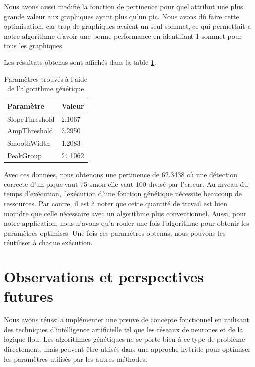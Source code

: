 \documentclass[12pt,letterpaper]{article}
\begin{document}
Nous avons aussi modifié la fonction de pertinence pour quel attribut une plus grande valeur aux graphiques ayant plus qu’un pic.
Nous avons dû faire cette optimisation, car trop de graphiques avaient un seul sommet, ce qui permettait a notre algorithme d'avoir une bonne
performance en identifiant 1 sommet pour tous les graphiques.

Les résultats obtenus sont affichés dans la table \ref{tab:genparam}.

\begin{table}[h]
  \begin{center}
    \begin{tabular} {|l|l|}
        \hline
        \bf{Paramètre} & \bf{Valeur} \\
        \hline
        SlopeThreshold & 2.1067 \\
        \hline
        AmpThreshold & 3.2950 \\
        \hline
        SmoothWidth & 1.2083 \\
        \hline
        PeakGroup & 24.1062 \\
        \hline
    \end{tabular}
    \caption{Paramètres trouvés à l'aide de l'algorithme génétique}
    \label{tab:genparam}
  \end{center}
\end{table}

Avec ces données, nous obtenons une pertinence de 62.3438 où une détection correcte d'un pique vaut 75 sinon elle vaut 100 divisé par l'erreur.
Au niveau du temps d'exécution, l'exécution d'une fonction génétique nécessite beaucoup de ressources. Par contre, il est à noter que
cette quantité de travail est bien moindre que celle nécessaire avec un algorithme plus conventionnel. Aussi, pour notre application, nous n'avons
qu'a rouler une fois l'algorithme pour obtenir les paramètres optimisés. Une fois ces paramètres obtenus, nous pouvons les réutiliser à chaque exécution.

\section{Observations et perspectives futures}

Nous avons réussi a implémenter une preuve de concepte fonctionnel en utilisant des techniques d'intélligence artificielle tel que les réseaux de neurones et de la logique flou. Les algorithmes génétiques ne se porte bien à ce type de problème directement, mais peuvent être utlisés dans une approche hybride pour optimiser les paramètres utilisés par les autres méthodes. 
\end{document}
